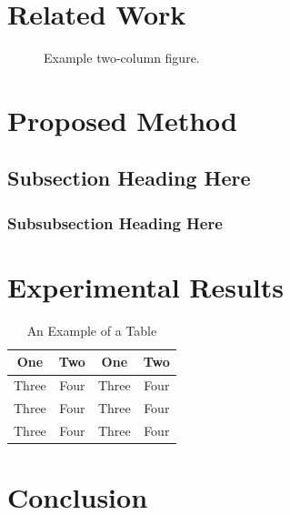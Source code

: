 \documentclass[10pt,journal,compsoc]{IEEEtran}
\begin{document}
\section{Related Work}
\lipsum[5-6]

\begin{figure}[!t]
\centering
{}
\caption{Example two-column figure.}
\end{figure}

\section{Proposed Method}
\lipsum[7]

\subsection{Subsection Heading Here}
\lipsum[8-9]

\subsubsection{Subsubsection Heading Here}
\lipsum[10-12]


\section{Experimental Results}

\lipsum[13-17]

\begin{table}[!t]
\renewcommand{\arraystretch}{1.3}
\caption{An Example of a Table}
\centering
\begin{tabular}{c||c|c|c}
\hline
One & Two & One & Two\\
\hline\hline
Three & Four &Three & Four\\
\hline
Three & Four &Three & Four\\
\hline
Three & Four &Three & Four\\
\hline
\end{tabular}
\end{table}


\section{Conclusion}
\lipsum[18]
\end{document}
